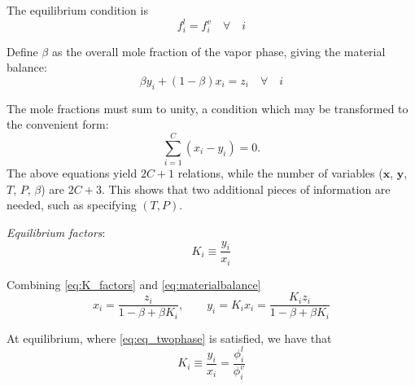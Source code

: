\documentclass[internal,english]{sintefmemo2012}
\newcommand*{\vektor}[1]{\boldsymbol{#1}}%
\begin{document}
The equilibrium condition is 
\begin{equation}
  f_i^l = f_i^v \quad \forall \quad i
  \label{eq:eq_twophase}
\end{equation}

Define $\beta$ as the overall mole fraction of the vapor phase, giving the material balance:
\begin{equation}
  \beta y_i + (1-\beta)x_i = z_i \quad \forall \quad i
  \label{eq:materialbalance}
\end{equation}

The mole fractions must sum to unity, a condition which may be transformed to the convenient form:
\begin{equation}
  \sum_{i=1}^C \left( x_i - y_i \right) = 0.
  \label{eq:mole_frac_sum}
\end{equation}
The above equations yield $2C + 1$ relations, while the number of variables ($\vektor{x}$, $\vektor{y}$, $T$, $P$, $\beta$) are $2C + 3$. 
This shows that two additional pieces of information are needed, such as specifying $(T,P)$.


\textit{Equilibrium factors}:
\begin{equation}
  K_i \equiv \frac{y_i}{x_i}
  \label{eq:K_factors}
\end{equation}


Combining \eqref{eq:K_factors} and \eqref{eq:materialbalance}
\begin{equation}
  x_i = \frac{z_i}{1 - \beta + \beta K_i}, \quad\quad y_i = K_i x_i = \frac{K_i z_i}{1 - \beta + \beta K_i} 
  \label{eq:xy_and_Kbeta}
\end{equation}

At equilibrium, where \eqref{eq:eq_twophase} is satisfied, we have that 
\begin{equation}
  K_i \equiv \frac{y_i}{x_i} = \frac{\phi_i^l}{\phi_i^v}
  \label{eq:K_eq}
\end{equation}
\end{document}
